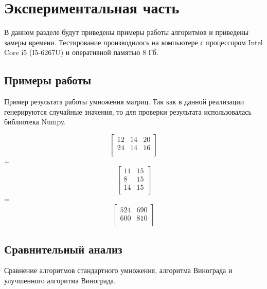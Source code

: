 \documentclass[12pt]{article}
\begin{document}
\section{Экспериментальная часть}
В данном разделе будут приведены примеры работы алгоритмов и приведены замеры времени. Тестирование производилось на компьютере с процессором Intel Core i5 (I5-6267U) и оперативной памятью 8 Гб. 
\subsection{Примеры работы}

	Пример результата работы умножения матриц. Так как в данной реализации генерируются случайные значения, то для проверки результата использовалась библиотека Numpy. 
	\newline

$$\begin{bmatrix} 
12 & 14 & 20 \\
24 & 14 & 16 \\
\end{bmatrix}$$
+
$$\begin{bmatrix} 
11 &15\\
8 & 15 \\
14 & 15 \\
\end{bmatrix}$$
=
$$\begin{bmatrix} 
524 & 690 \\
600 & 810 \\
\end{bmatrix}$$

\subsection{Сравнительный анализ}
Сравнение алгоритмов стандартного умножения, алгоритма Винограда и улучшенного алгоритма Винограда.
\newline
{}
\end{document}
